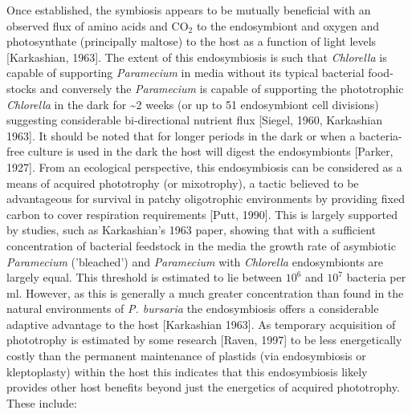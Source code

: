\documentclass[a4paper,11pt]{article}
\begin{document}
Once established, the symbiosis appears to be mutually beneficial with an observed flux of amino acids and CO$_{2}$ to the endosymbiont and oxygen and photosynthate (principally maltose) to the host as a function of light levels [Karkashian, 1963]. 
The extent of this endosymbiosis is such that \textit{Chlorella} is capable of supporting \textit{Paramecium} in media without its typical bacterial food-stocks and conversely the \textit{Paramecium} is capable of supporting the phototrophic \textit{Chlorella} in the dark for \textasciitilde 2 weeks (or up to 51 endosymbiont cell divisions) suggesting considerable bi-directional nutrient flux [Siegel, 1960, Karkashian 1963]. 
It should be noted that for longer periods in the dark or when a bacteria-free culture is used in the dark the host will digest the endosymbionts [Parker, 1927].   
From an ecological perspective, this endosymbiosis can be considered as a means of acquired phototrophy (or mixotrophy), a tactic believed to be advantageous for survival in patchy oligotrophic environments by providing fixed carbon to cover respiration requirements [Putt, 1990].  
This is largely supported by studies, such as Karkashian's 1963 paper, showing that with a sufficient concentration of bacterial feedstock in the media the growth rate of asymbiotic \textit{Paramecium} ('bleached') and \textit{Paramecium} with \textit{Chlorella} endosymbionts are largely equal.
This threshold is estimated to lie between $10^{6}$ and $10^{7}$ bacteria per ml.  
However, as this is generally a much greater concentration than found in the natural environments of \textit{P. bursaria} the endosymbiosis offers a considerable adaptive advantage to the host [Karkashian 1963].  
As temporary acquisition of phototrophy is estimated by some research [Raven, 1997] to be less energetically costly than the permanent maintenance of plastids (via endosymbiosis or kleptoplasty) within the host this indicates that this endosymbiosis likely provides other host benefits beyond just the energetics of acquired phototrophy. These include: 
\end{document}
